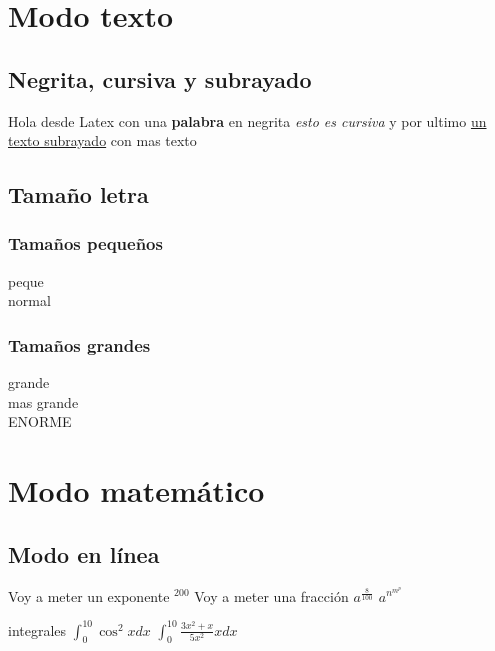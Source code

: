 \documentclass[10pt, a4paper]{report}
\begin{document}
\pagebreak
\tableofcontents
\pagebreak

\chapter{Modo texto}

\section{Negrita, cursiva y subrayado}

Hola desde Latex con
una {\bf palabra} en negrita
{\it esto es cursiva} y
por ultimo
\underline {un texto subrayado} con mas texto

\section{Tamaño letra}

\subsection{Tamaños pequeños}
{\tiny peque \\}
{\normalsize normal \\}
\subsection{Tamaños grandes}
{\large grande \\}
{\LARGE mas grande \\}
{\Huge ENORME \\}

\chapter{Modo matemático}

\section{Modo en línea}

Voy a meter un exponente $^{200} $
Voy a meter una fracción $ a^{\frac{8}{100}} $
$ a^{n^{m^{p}}} $

integrales $ \int_{0}^{10} \cos^2 x dx $
$ \int_{0}^{10} \frac{3x^2+x}{5x^2} x dx $
\end{document}
